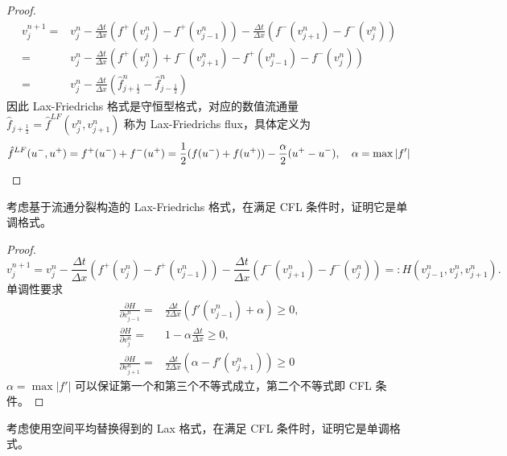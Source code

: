 \begin{proof}
    {\small
        \begin{align*}
            v_j^{n+1} ={} & v_j^n - \frac{\Delta t}{\Delta x}(f^+(v_{j}^n)-f^+(v_{j-1}^n))
            - \frac{\Delta t}{\Delta x}(f^-(v_{j+1}^n)-f^-(v_{j}^n))                       \\
            ={}           & v_j^n - \frac{\Delta t}{\Delta x}\left(
            f^+(v_{j}^n) + f^-(v_{j+1}^n) - f^+(v_{j-1}^n) - f^-(v_{j}^n)
            \right)                                                                        \\
            ={}           & v_j^n - \frac{\Delta t}{\Delta x}\left(
            \hat{f}_{j+\frac12}^n - \hat{f}_{j-\frac12}^n
            \right)
        \end{align*}}
    因此 Lax-Friedrichs 格式是守恒型格式，对应的数值流通量 $\hat{f}_{j+\frac12} = \hat{f}^{LF}(v_j^n,v_{j+1}^n)$ 称为 Lax-Friedrichs flux，具体定义为
    \[
        \hat{f}^{LF}(u^-,u^+) =
        f^+(u^-) + f^-(u^+) =
        \frac12(f(u^-)+f(u^+)) - \frac{\alpha}2 (u^+-u^-),\quad \alpha = \max |f'| \qedhere
    \]
\end{proof}


\begin{example}
    考虑基于流通分裂构造的 Lax-Friedrichs 格式，在满足 CFL 条件时，证明它是单调格式。
\end{example}

\begin{proof}
    \[
        v_j^{n+1} ={}  v_j^n - \frac{\Delta t}{\Delta x}(f^+(v_{j}^n)-f^+(v_{j-1}^n))
        - \frac{\Delta t}{\Delta x}(f^-(v_{j+1}^n)-f^-(v_{j}^n))   =:   H(v_{j-1}^n,v_j^n,v_{j+1}^n).
    \]
    单调性要求
    \begin{align*}
        \frac{\partial H}{\partial v^n_{j-1}} ={} & \frac{\Delta t}{2\Delta x}(f'(v^n_{j-1})+\alpha)\ge 0 , \\
        \frac{\partial H}{\partial v^n_{j}} ={}   & 1-\alpha\frac{\Delta t}{\Delta x}\ge 0,                 \\
        \frac{\partial H}{\partial v^n_{j+1}} ={} & \frac{\Delta t}{2\Delta x}(\alpha-f'(v^n_{j+1}))\ge  0
    \end{align*}
    $\alpha = \max |f'|$ 可以保证第一个和第三个不等式成立，第二个不等式即 CFL 条件。
\end{proof}

\begin{example}
    考虑使用空间平均替换得到的 Lax 格式，在满足 CFL 条件时，证明它是单调格式。
\end{example}

